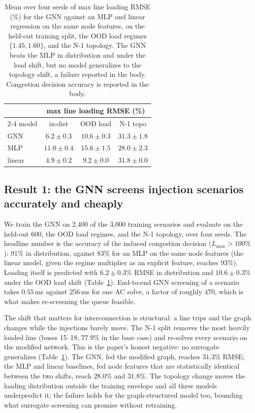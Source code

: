 \documentclass{article}
\begin{document}
\begin{table}[t]
  \centering
  \small
  \begin{tabular}{lccc}
    \toprule
    & \multicolumn{3}{c}{max line loading RMSE (\%)} \\
    \cmidrule(lr){2-4}
    model & in-dist & OOD load & N-1 topo \\
    \midrule
    GNN & $6.2\pm0.3$ & $10.6\pm0.3$ & $31.3\pm1.8$ \\
    MLP & $11.0\pm0.4$ & $15.6\pm1.5$ & $28.0\pm2.3$ \\
    linear & $4.9\pm0.2$ & $9.2\pm0.0$ & $31.8\pm0.0$ \\
    \bottomrule
  \end{tabular}
  \caption{Mean over four seeds of max line loading RMSE (\%) for the GNN
  against an MLP and linear regression on the same node features, on the
  held-out training split, the OOD load regimes $\{1.45,1.60\}$, and the
  N-1 topology. The GNN beats the MLP in distribution and under the load
  shift, but no model generalizes to the topology shift, a failure reported
  in the body. Congestion decision accuracy is reported in the body.}
  \label{tab:screening}
\end{table}

\subsection{Result 1: the GNN screens injection scenarios accurately and cheaply}

We train the GNN on 2{,}400 of the 3{,}000 training scenarios and evaluate on
the held-out 600, the OOD load regimes, and the N-1 topology, over four
seeds. The headline number is the accuracy of the induced congestion
decision ($L_{\max}>100\%$): $91\%$ in distribution, against $83\%$ for an
MLP on the same node features (the linear model, given the regime
multiplier as an explicit feature, reaches $93\%$). Loading itself is
predicted with $6.2\pm0.3\%$ RMSE in distribution and $10.6\pm0.3\%$ under
the OOD load shift (Table~\ref{tab:screening}). End-to-end GNN screening of
a scenario takes $0.55$\,ms against $256$\,ms for one AC solve, a factor of
roughly $470$, which is what makes re-screening the queue feasible.

The shift that matters for interconnection is structural: a line trips and
the graph changes while the injections barely move. The N-1 split removes
the most heavily loaded line (buses 15--18, $77.9\%$ in the base case) and
re-solves every scenario on the modified network. This is the paper's
honest negative: no surrogate generalizes (Table~\ref{tab:screening}). The
GNN, fed the modified graph, reaches $31.3\%$ RMSE; the MLP and linear
baselines, fed node features that are statistically identical between the
two shifts, reach $28.0\%$ and $31.8\%$. The topology change moves the
loading distribution outside the training envelope and all three models
underpredict it; the failure holds for the graph-structured model too,
bounding what surrogate screening can promise without retraining.
\end{document}
